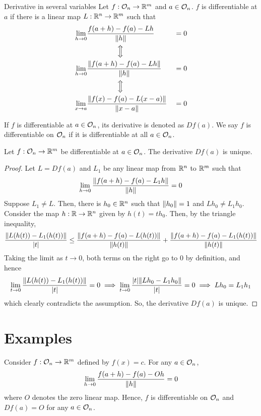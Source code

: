 \documentclass[../Analysis-3]{subfiles}
\begin{document}
\begin{Def}{Derivative in several variables}{}
  Let $ f : \mathcal{O}_{n} \to \mathbb{R}^m $ and $ a \in \mathcal{O}_{n} $. $ f $ is differentiable at $ a $ if there is a linear map $ L : \mathbb{R}^n \to \mathbb{R}^m $ such that
  \begin{alignat*}{2}
    \lim_{h \to 0} & \frac{f(a+h)-f(a)-Lh}{\norm{h}}            &  & = 0 \\
                   & \qquad \qquad \,\,\Big \Updownarrow                 \\
    \lim_{h \to 0} & \frac{\norm{f(a+h)-f(a)-Lh}}{\norm{h}}     &  & = 0 \\
                   & \qquad \qquad \,\, \Big \Updownarrow                \\
    \lim_{x \to a} & \frac{\norm{f(x)-f(a)-L(x-a)}}{\norm{x-a}} &  & = 0 \\
  \end{alignat*}

  If $ f $ is differentiable at $ a \in \mathcal{O}_{n} $, its derivative is denoted as $ Df(a) $. We say $ f $ is differentiable on $ \mathcal{O}_{n} $ if it is differentiable at all $ a \in \mathcal{O}_{n} $.
\end{Def}

\begin{Thm}{}{}
  Let $ f: \mathcal{O}_{n} \to \mathbb{R}^m $ be differentiable at $ a \in \mathcal{O}_{n} $. The derivative $ Df(a) $ is unique.
\end{Thm}
\begin{proof}
  Let $ L = Df(a) $ and $ L_1 $ be any linear map from $ \mathbb{R}^n $ to $ \mathbb{R}^m $ such that
  \[ \lim_{h \to 0} \frac{\norm{f(a+h)-f(a)-L_1h}}{\norm{h}} = 0 \]
  Suppose $ L_1 \neq L $. Then, there is $ h_0 \in \mathbb{R}^n $ such that $ \norm{h_0} = 1 $ and $ Lh_0 \neq L_1h_0 $. Consider the map $ h: \mathbb{R} \to \mathbb{R}^n $ given by $ h(t) = th_0 $. Then, by the triangle inequality,
  \[ \frac{\norm{L(h(t))-L_1(h(t))}}{\abs{t}} \leq \frac{\norm{f(a+h)-f(a)-L(h(t))}}{\norm{h(t)}} + \frac{\norm{f(a+h)-f(a)-L_1(h(t))}}{\norm{h(t)}} \]
  Taking the limit as $ t \to 0 $, both terms on the right go to 0 by definition, and hence
  \[ \lim_{t \to 0} \frac{\norm{L(h(t))-L_1(h(t))}}{\abs{t}} = 0 \implies \lim_{t \to 0} \frac{\abs{t}\norm{Lh_0-L_1h_0}}{\abs{t}} = 0 \implies Lh_0 = L_1h_1\]
  which clearly contradicts the assumption. So, the derivative $ Df(a) $ is unique.
\end{proof}

\section{Examples}
\begin{Eg}{}{}
  Consider $ f: \mathcal{O}_{n} \to\mathbb{R}^m $ defined by $ f(x) = c $. For any $ a \in \mathcal{O}_{n} $,
  \[ \lim_{h \to 0} \frac{f(a+h)-f(a)-Oh}{\norm{h}} = 0 \]
  where $ O $ denotes the zero linear map. Hence, $ f $ is differentiable on $ \mathcal{O}_{n} $ and $ Df(a) = O $ for any $ a \in \mathcal{O}_{n} $.
\end{Eg}
\end{document}
